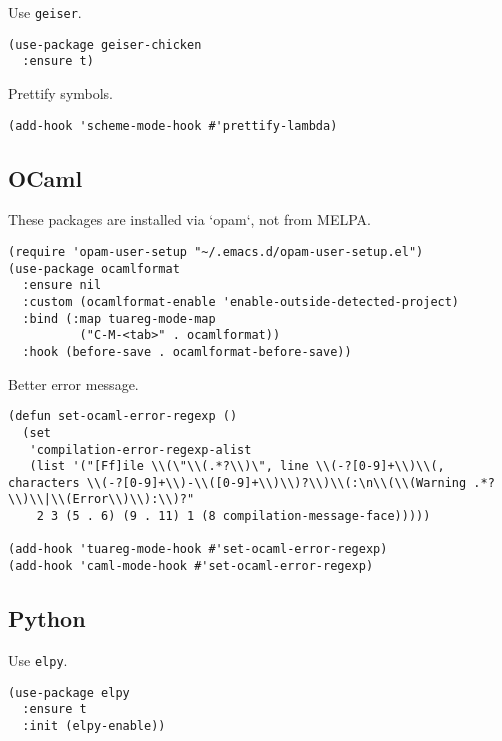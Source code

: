 \documentclass[a4paper,11pt]{article}
\begin{document}
Use \texttt{geiser}.
\begin{verbatim}
(use-package geiser-chicken
  :ensure t)
\end{verbatim}

Prettify symbols.
\begin{verbatim}
(add-hook 'scheme-mode-hook #'prettify-lambda)
\end{verbatim}

\subsection{OCaml}
\label{sec:org591d3be}
These packages are installed via `opam`, not from MELPA.
\begin{verbatim}
(require 'opam-user-setup "~/.emacs.d/opam-user-setup.el")
(use-package ocamlformat
  :ensure nil
  :custom (ocamlformat-enable 'enable-outside-detected-project)
  :bind (:map tuareg-mode-map
	      ("C-M-<tab>" . ocamlformat))
  :hook (before-save . ocamlformat-before-save))
\end{verbatim}

Better error message.
\begin{verbatim}
(defun set-ocaml-error-regexp ()
  (set
   'compilation-error-regexp-alist
   (list '("[Ff]ile \\(\"\\(.*?\\)\", line \\(-?[0-9]+\\)\\(, characters \\(-?[0-9]+\\)-\\([0-9]+\\)\\)?\\)\\(:\n\\(\\(Warning .*?\\)\\|\\(Error\\)\\):\\)?"
    2 3 (5 . 6) (9 . 11) 1 (8 compilation-message-face)))))

(add-hook 'tuareg-mode-hook #'set-ocaml-error-regexp)
(add-hook 'caml-mode-hook #'set-ocaml-error-regexp)
\end{verbatim}

\subsection{Python}
\label{sec:org91c98cf}
Use \texttt{elpy}.
\begin{verbatim}
(use-package elpy
  :ensure t
  :init (elpy-enable))
\end{verbatim}
\end{document}
